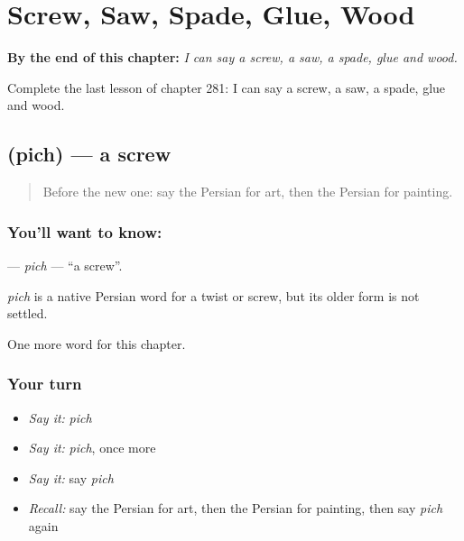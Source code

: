 
\chapter{Screw, Saw, Spade, Glue, Wood}
\label{ch:fa-screw-saw-spade-glue-wood}

\begin{chapteropening}
\textbf{By the end of this chapter:} \emph{I can say a screw, a saw, a spade, glue and wood.}

Complete the last lesson of chapter 281: I can say a screw, a saw, a spade, glue and wood.
\end{chapteropening}

\section[\texorpdfstring{\fa{پیچ} (pich)}{پیچ (pich)}]{ (pich) — a screw}

\label{lesson:FA-C281-pich}



\begin{quote}
Before the new one: say the Persian for art, then the Persian for painting.
\end{quote}

\subsection*{You'll want to know: }
\textbf{} — \emph{pich} — \textquotedblleft{}a screw\textquotedblright{}.

\begin{cousinweb}
\emph{pich} is a native Persian word for a twist or screw, but its older form is not settled.
\end{cousinweb}

\begin{grammarlens}[title={What you've built}]
One more word for this chapter.
\end{grammarlens}

\subsection*{Your turn}
\begin{itemize}
\raggedright
  \item \emph{Say it:} \emph{pich}
  \item \emph{Say it:} \emph{pich}, once more
  \item \emph{Say it:} say \emph{pich}
  \item \emph{Recall:} say the Persian for art, then the Persian for painting, then say \emph{pich} again
\end{itemize}

